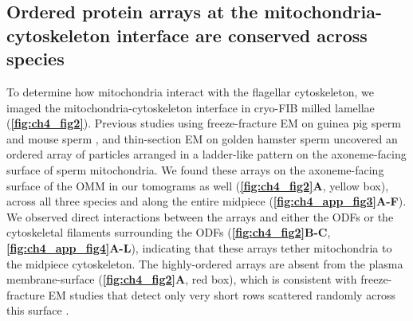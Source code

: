\subsection*{Ordered protein arrays at the mitochondria-cytoskeleton interface are conserved across species}
To determine how mitochondria interact with the flagellar cytoskeleton, we imaged the mitochondria-cytoskeleton interface in cryo-FIB milled lamellae (\textbf{\autoref{fig:ch4_fig2}}). Previous studies using freeze-fracture EM on guinea pig sperm \cite{Friend1981} and mouse sperm \cite{Woolley2005}, and thin-section EM on golden hamster sperm \cite{Olson1992} uncovered an ordered array of particles arranged in a ladder-like pattern on the axoneme-facing surface of sperm mitochondria. We found these arrays on the axoneme-facing surface of the OMM in our tomograms as well (\textbf{\autoref{fig:ch4_fig2}A}, yellow box), across all three species and along the entire midpiece (\textbf{\autoref{fig:ch4_app_fig3}A-F}). We observed direct interactions between the arrays and either the ODFs or the cytoskeletal filaments surrounding the ODFs (\textbf{\autoref{fig:ch4_fig2}B-C}, \textbf{\autoref{fig:ch4_app_fig4}A-L}), indicating that these arrays tether mitochondria to the midpiece cytoskeleton. The highly-ordered arrays are absent from the plasma membrane-surface (\textbf{\autoref{fig:ch4_fig2}A}, red box), which is consistent with freeze-fracture EM studies that detect only very short rows scattered randomly across this surface \cite{Friend1981}.

